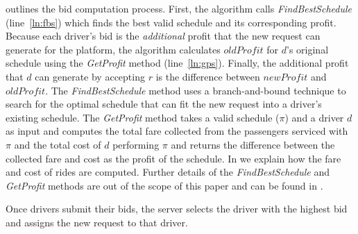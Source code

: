  outlines the bid computation process. First, the algorithm calls \textit{FindBestSchedule} (line~\ref{ln:fbs}) which finds the best valid schedule and its corresponding profit. Because each driver's bid is the \textit{additional} profit that the new request can generate for the platform, the algorithm calculates $oldProfit$ for $d$'s original schedule using the \textit{GetProfit} method (line~\ref{ln:gps}). Finally, the additional profit that $d$ can generate by accepting $r$ is the difference between $newProfit$ and $oldProfit$. The \textit{FindBestSchedule} method uses a branch-and-bound technique to search for the optimal schedule that can fit the new request into a driver's existing schedule. The \textit{GetProfit} method takes a valid schedule ($\pi$) and a driver $d$ as input and computes the total fare collected from the passengers serviced with $\pi$ and the total cost of $d$ performing $\pi$ and returns the difference between the collected fare and cost as the profit of the schedule. In  we explain how the fare and cost of rides are computed. Further details of the \textit{FindBestSchedule} and \textit{GetProfit} methods are out of the scope of this paper and can be found in \cite{Asghari16}.

Once drivers submit their bids, the server selects the driver with the highest bid and assigns the new request to that driver.